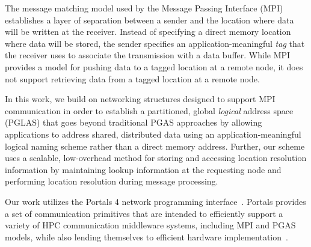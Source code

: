 The message matching model used by the Message Passing Interface
(MPI)~\cite{mpi-forum:15} establishes a layer of separation between a
sender and the location where data will be written at the receiver.
Instead of specifying a direct memory location where data will be
stored, the sender specifies an application-meaningful {\em tag} that
the receiver uses to associate the transmission with a data buffer.
While MPI provides a model for pushing data to a tagged location at a
remote node, it does not support retrieving data from a tagged
location at a remote node.


In this work, we build on networking structures designed to support
MPI communication in order to establish a partitioned, global {\em
  logical} address space (PGLAS) that goes beyond traditional PGAS
approaches by allowing applications to address shared, distributed
data using an application-meaningful logical naming scheme rather than
a direct memory address.  Further, our scheme uses a scalable,
low-overhead method for storing and accessing location resolution
information by maintaining lookup information at the requesting node
and performing location resolution during message processing.

Our work utilizes the Portals 4 network programming
interface~\cite{portals4}.  Portals provides a set of communication
primitives that are intended to efficiently support a variety of HPC
communication middleware systems, including MPI and PGAS models, while
also lending themselves to efficient hardware
implementation~\cite{brightwell:micro:06,bxi}.


